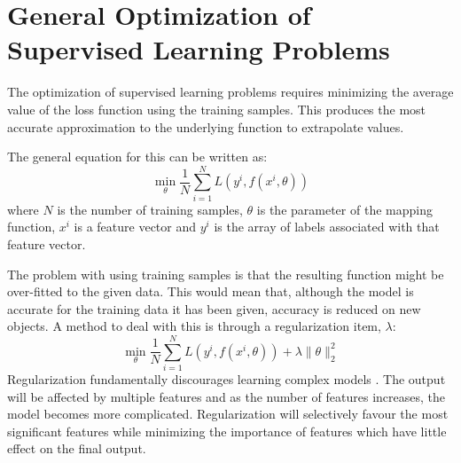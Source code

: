 \documentclass[10pt,a4paper]{report}
\begin{document}
		\section{General Optimization of Supervised Learning Problems}
			The optimization of supervised learning problems requires minimizing the average value of the loss function using the training samples. This produces the
			most accurate approximation to the underlying function to extrapolate values. \par
			The general equation \autocite[p. 3]{SurveyOfOptimizationMethods} for this can be written as:
			\begin{equation}
				\min_\theta \frac{1}{N} \sum_{i=1}^{N} L(y^i, f(x^i,\theta))
				\label{eq:supervised-learning-general}
			\end{equation}
			where $N$ is the number of training samples, $\theta$ is the parameter of the mapping function, $x^i$ is a feature vector
			and $y^i$ is the array of labels associated with that feature vector. \par
			The problem with using training samples is that the resulting function might be over-fitted to the given data. This would mean
			that, although the model is accurate for the training data it has been given, accuracy is reduced on new objects. A method to
			deal with this is through a regularization item, $\lambda$:
			\begin{equation}
				\min_\theta \frac{1}{N} \sum_{i=1}^{N} L(y^i, f(x^i,\theta)) + \lambda\| \theta\|_{2}^{2}
				\label{eq:supervised-learning-regularization}
			\end{equation}
			Regularization fundamentally discourages learning complex models \autocite[p. 4]{OverfittingSupervisedLearning}. The output will be affected by multiple features and as the number of features increases,
			the model becomes more complicated. Regularization will selectively favour the most significant features while minimizing the importance of features which have little effect on the final output.
\end{document}
